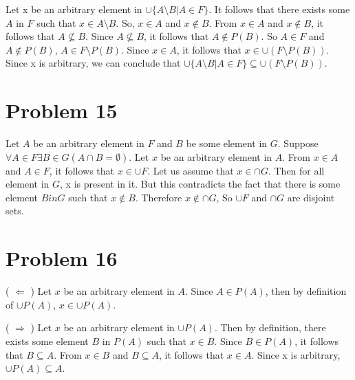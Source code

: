 \documentclass{article}
\begin{document}
Let x be an arbitrary element in $\cup \{ A \setminus B | A \in F \}$.
It follows that there exists some $A$ in $F$ such that $x \in A
\setminus B$. So, $x \in A$ and $x \notin B$. From $x \in A$ and $x
\notin B$, it follows that $A \nsubseteq B$. Since $A \nsubseteq B$,
it follows that $A \notin P(B)$. So $A \in F$ and $A \notin P(B)$, $A
\in F \setminus P(B)$. Since $x \in A$, it follows that $x \in \cup(F
\setminus P(B))$. Since x is arbitrary, we can conclude that $\cup \{
A \setminus B | A \in F \} \subseteq \cup (F \setminus P(B))$.

\section{Problem 15}

Let $A$ be an arbitrary element in $F$ and $B$ be some element in $G$.
Suppose $\forall A \in F \exists B \in G (A \cap B = \emptyset)$. Let
$x$ be an arbitrary element in $A$. From $x \in A$ and $A \in F$, it
follows that $x \in \cup F$. Let us assume that $x \in \cap G$. Then
for all element in $G$, x is present in it. But this contradicts the
fact that there is some element $B in G$ such that $x \notin B$.
Therefore $x \notin \cap G$, So $\cup F$ and $\cap G$ are disjoint
sets.

\section{Problem 16}

( $\Leftarrow$ ) Let $x$ be an arbitrary element in $A$. Since $A \in
P(A)$, then by definition of $\cup P(A)$, $x \in \cup P(A)$.

( $\Rightarrow$ ) Let $x$ be an arbitrary element in $\cup P(A)$. Then
by definition, there exists some element $B$ in $P(A)$ such that $x
\in B$. Since $B \in P(A)$, it follows that $B \subseteq A$. From $x
\in B$ and $B \subseteq A$, it follows that $x \in A$. Since x is
arbitrary, $\cup P(A) \subseteq A$.
\end{document}
